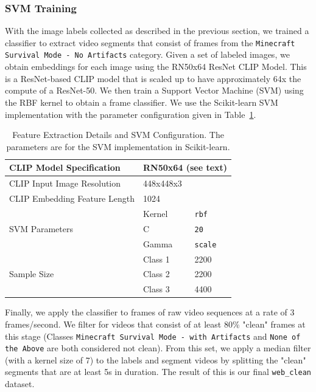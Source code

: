 \subsubsection{SVM Training}

With the image labels collected as described in the previous section, we trained a classifier to extract video segments that consist of frames from the \texttt{Minecraft Survival Mode - No Artifacts} category.
Given a set of labeled images, we obtain embeddings for each image using the RN50x64 ResNet CLIP Model.\cite{radford2021learning} This is a ResNet-based CLIP model that is scaled up to have approximately 64x the compute of a ResNet-50. We then train a Support Vector Machine (SVM) using the RBF kernel to obtain a frame classifier. We use the Scikit-learn\cite{pedregosa2011scikit} SVM implementation with the parameter configuration given in Table~\ref{svmtable}.


\begin{table}[htbp]
\centering
\begin{center}
\begin{tabular}{ |l|l|l|}
\hline
 CLIP Model Specification & \multicolumn{2}{l|}{RN50x64 (see text)}\\
 \hline
 CLIP Input Image Resolution & \multicolumn{2}{l|}{448x448x3} \\
 \hline
 CLIP Embedding Feature Length & \multicolumn{2}{l|}{1024} \\
 \hline
 \multirow{3}{*}{SVM Parameters} & Kernel & \texttt{rbf} \\
 \cline{2-3} 
 & C & \texttt{20}\\
 \cline{2-3} 
 & Gamma & \texttt{scale} \\
  \hline
 \multirow{3}{*}{Sample Size} & Class 1 & 2200 \\
 \cline{2-3} 
 & Class 2 & 2200\\
 \cline{2-3} 
 & Class 3 & 4400 \\
 \hline
\end{tabular}
\end{center}
\caption{Feature Extraction Details and SVM Configuration. The parameters are for the SVM implementation in Scikit-learn\cite{pedregosa2011scikit}.
}
\label{svmtable}
\end{table}

Finally, we apply the classifier to frames of raw video sequences at a rate of 3 frames/second. We filter for videos that consist of at least 80\% "clean" frames at this stage (Classes \texttt{Minecraft Survival Mode - with Artifacts} and \texttt{None of the Above} are both considered not clean). From this set, we apply a median filter (with a kernel size of 7) to the labels and segment videos by splitting the "clean" segments that are at least 5s in duration. The result of this is our final \texttt{web\_clean} dataset.

